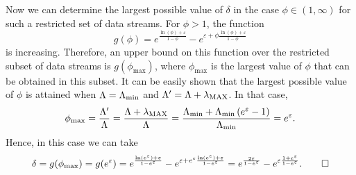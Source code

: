 Now we can determine the largest possible value of $\delta$ in the case $\phi \in (1, \infty)$ for such a restricted set of data streams. For $\phi > 1$, the function
\[
g(\phi) = e^{\frac{\ln(\phi) + \varepsilon}{1-\phi}} - e^{\varepsilon + \phi \frac{\ln(\phi) + \varepsilon}{1-\phi}}
\]
is increasing. Therefore, an upper bound on this function over the restricted subset of data streams is $g(\phi_{\max})$, where $\phi_{\max}$ is the largest value of $\phi$ that can be obtained in this subset. It can be easily shown that the largest possible value of $\phi$ is attained when $\Lambda = \Lambda_{\min}$ and $\Lambda' = \Lambda + \lambda_{\mathrm{MAX}}$. In that case,
\[
\phi_{\max} = \frac{\Lambda'}{\Lambda} = \frac{\Lambda + \lambda_{\mathrm{MAX}}}{\Lambda} = \frac{\Lambda_{\min} + \Lambda_{\min}\left(e^{\varepsilon} - 1\right)}{\Lambda_{\min}} = e^{\varepsilon}.
\]
Hence, in this case we can take
\[
\delta = g(\phi_{\max}) = g(e^{\varepsilon})
  = e^{\frac{\ln(e^{\varepsilon}) + \varepsilon}{1 - e^{\varepsilon}}} - e^{\varepsilon + e^{\varepsilon} \frac{\ln(e^{\varepsilon}) + \varepsilon}{1 - e^{\varepsilon}}}
  = e^{\frac{2\varepsilon}{1 - e^{\varepsilon}}} - e^{\varepsilon\frac{1 + e^{\varepsilon}}{1 - e^{\varepsilon}}}. \qed
\]
